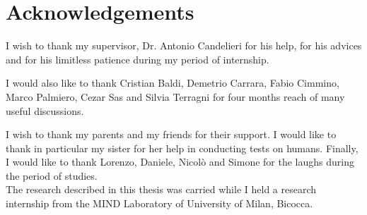 \chapter*{Acknowledgements}
\pagestyle{empty}

I wish to thank my supervisor, Dr. Antonio Candelieri for his help, for his advices and for his limitless patience during my period of internship.

I would also like to thank Cristian Baldi, Demetrio Carrara, Fabio Cimmino, Marco Palmiero, Cezar Sas and Silvia Terragni for four months reach of many useful discussions.

I wish to thank my parents and my friends for their support. I would like to thank in particular my sister for her help in conducting tests on humans. Finally, I would like to thank Lorenzo, Daniele, Nicolò and Simone for the laughs during the period of studies. \\

The research described in this thesis was carried while I held a research internship from the MIND Laboratory of University of Milan, Bicocca. \\

